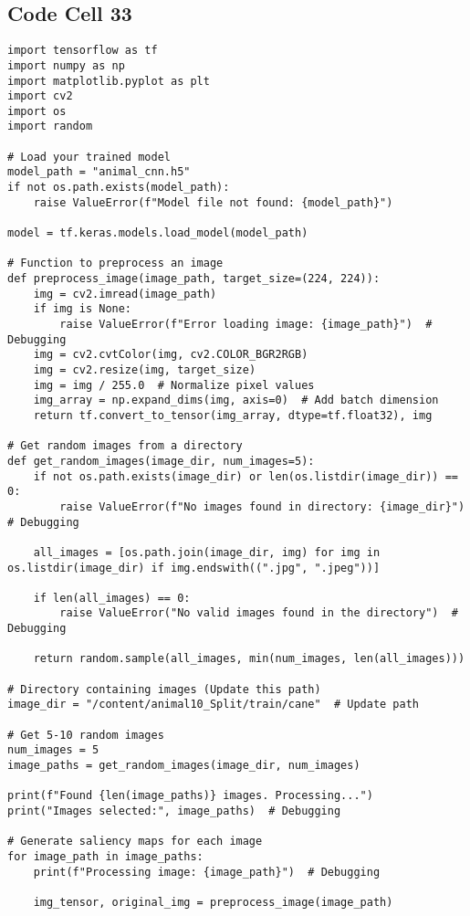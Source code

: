 \documentclass{article}
\begin{document}
\subsection*{Code Cell 33}
\begin{lstlisting}
import tensorflow as tf
import numpy as np
import matplotlib.pyplot as plt
import cv2
import os
import random

# Load your trained model
model_path = "animal_cnn.h5"
if not os.path.exists(model_path):
    raise ValueError(f"Model file not found: {model_path}")

model = tf.keras.models.load_model(model_path)

# Function to preprocess an image
def preprocess_image(image_path, target_size=(224, 224)):
    img = cv2.imread(image_path)
    if img is None:
        raise ValueError(f"Error loading image: {image_path}")  # Debugging
    img = cv2.cvtColor(img, cv2.COLOR_BGR2RGB)
    img = cv2.resize(img, target_size)
    img = img / 255.0  # Normalize pixel values
    img_array = np.expand_dims(img, axis=0)  # Add batch dimension
    return tf.convert_to_tensor(img_array, dtype=tf.float32), img

# Get random images from a directory
def get_random_images(image_dir, num_images=5):
    if not os.path.exists(image_dir) or len(os.listdir(image_dir)) == 0:
        raise ValueError(f"No images found in directory: {image_dir}")  # Debugging

    all_images = [os.path.join(image_dir, img) for img in os.listdir(image_dir) if img.endswith((".jpg", ".jpeg"))]

    if len(all_images) == 0:
        raise ValueError("No valid images found in the directory")  # Debugging

    return random.sample(all_images, min(num_images, len(all_images)))

# Directory containing images (Update this path)
image_dir = "/content/animal10_Split/train/cane"  # Update path

# Get 5-10 random images
num_images = 5
image_paths = get_random_images(image_dir, num_images)

print(f"Found {len(image_paths)} images. Processing...")
print("Images selected:", image_paths)  # Debugging

# Generate saliency maps for each image
for image_path in image_paths:
    print(f"Processing image: {image_path}")  # Debugging

    img_tensor, original_img = preprocess_image(image_path)


\end{lstlisting}
\end{document}
